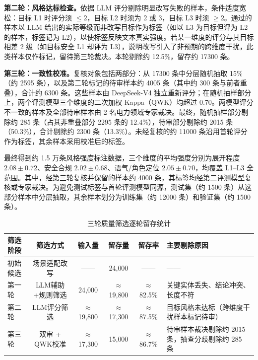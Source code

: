 \documentclass[fontset=fandol,type=master,campus=shenzhen,etitleauto=true]{hithesisbook}
\begin{document}
\textbf{第二轮：风格达标检查。}依据 LLM 评分剔除明显改写失败的样本，条件适度宽松：目标 L1 时评分须 $\le 2$，目标 L2 时须为 2 或 3，目标 L3 时须 $\ge 2$。通过的样本以 LLM 给出的实际等级而非改写目标作为标签（如以 L3 为目标但评为 L2 的样本，标签记为 L2），以使标签反映文本真实强度。若某一维度的评分与其目标相差 2 级（如目标安全 L1 却评为 L3），说明改写引入了非预期的跨维度干扰，此类样本仅作标记，留待第三轮裁决。本轮剔除约 12.5\%，留存约 17300 条。

\textbf{第三轮：一致性校准。}复核对象包括两部分：从 17300 条中分层随机抽取 15\%（约 2595 条），以及第二轮标记的待审样本约 4005 条（其中约 300 条与前者重叠），合计约 6300 条。这些样本由 DeepSeek-V4 独立重新评分；在随机抽样部分上，两个评测模型三个维度的二次加权 Kappa（QWK）均超过 0.70。两模型评分不一致的样本及全部待审样本由 2 名电力领域专家裁决。最终，随机抽样部分剔除约 285 条（占其非重叠部分 2295 条的 12.4\%），待审部分剔除约 2015 条（50.3\%），合计剔除约 2300 条（13.3\%）。未经复核的约 11000 条沿用首轮评分作为标签，其余样本采用校准后的标签。

最终得到约 1.5 万条风格强度标注数据，三个维度的平均强度分别为展开程度 $2.08 \pm 0.72$、安全合规 $2.02 \pm 0.68$、语气/角色定位 $2.05 \pm 0.70$，均覆盖 L1--L3 全范围。其中，经第三轮复核并保留的样本约 4000 条，其标签均经第二评测模型复核或专家裁决。为避免测试标签与首轮评测模型同源，测试集（约 1500 条）从这部分样本中分层抽取，其余样本划分为训练集（约 12000 条）和验证集（约 1500 条）。

\begin{table}[htbp]
\centering
\caption{三轮质量筛选逐轮留存统计}
\label{tab:style-data-dist}
\small
\setlength{\tabcolsep}{4pt}
\renewcommand{\arraystretch}{1.1}
\begin{tabular}{l c c c c p{4.2cm}}
\toprule
\textbf{筛选阶段} & \textbf{筛选方式} & \textbf{输入量} & \textbf{留存量} & \textbf{留存率} & \textbf{主要剔除原因} \\
\midrule
初始候选   & 场景适配改写  &  ——   & 24{,}000 &  ——    &  —— \\
第一轮     & LLM辅助+规则筛选 & 24{,}000 & $\approx$19{,}800 & $\approx$82.5\% & 关键实体丢失、结论冲突、长度不符 \\
第二轮     & LLM评分筛选   & $\approx$19{,}800 & $\approx$17{,}300 & $\approx$87.5\% & 目标风格未达标（跨维度干扰样本标记待审） \\
第三轮     & 双审 + QWK校准 & $\approx$17{,}300 & 15{,}000 & $\approx$86.7\% & 待审样本裁决剔除约 2015 条，抽查分歧剔除约 285 条 \\
\bottomrule
\end{tabular}
\end{table}
\end{document}
